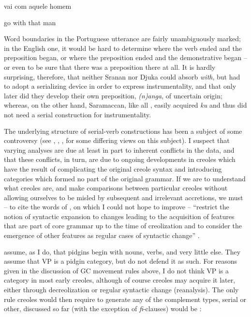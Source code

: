 \ea\label{ex:2:234}
vai com aquele homem
\z

\ea\label{ex:2:235}
go with that man
\z

Word boundaries in the Portuguese utterance are fairly un\-ambiguously marked; in the English one, it would be hard to determine where the verb ended and the preposition began, or where the preposi\-tion ended and the demonstrative began -- or even to be sure that there was a preposition there at all. It is hardly surprising, therefore, that neither Sranan nor Djuka could absorb \textit{with}, but had to adopt a serializing device in order to express instrumentality, and that only later did they develop their own preposition, \textit{(n)anga}, of uncertain origin; whereas, on the other hand, Saramaccan, like all , easily acquired \textit{ku} and thus did not need a serial construction for instrumentality.

The underlying structure of serial-verb constructions has been a subject of some controversy (see \citet{Williams1971,Williams1975}, \citet{Roberts1975}, \citet{Voorhoeve1975}, \citet{JansenEtAl1978} for some differing views on this subject). I suspect that varying analyses are due at least in part to inherent conflicts in the data, and that these conflicts, in turn, are due to ongoing developments in creoles which have the result of complicating the original creole syntax and intro\-ducing categories which formed no part of the original grammar. If we are to understand what creoles are, and make comparisons between particular creoles without allowing ourselves to be misled by sub\-sequent and irrelevant accretions, we must -- to cite the words of \citeauthor{KoopmanEtAl1981}, on which I could not hope to improve -- ``restrict the notion of syntactic expansion to changes leading to the acquisition of features that are part of core grammar up to the time of creolization and to consider the emergence of other features as regular cases of syntactic change'' \citep[218]{KoopmanEtAl1981}.

\citeauthor{KoopmanEtAl1981} assume, as I do, that pidgins begin with
nouns, verbs, and very little else. They assume that VP is a pidgin category, but do not defend it as such. For reasons given in the discussion of GC movement rules above, I do not think VP is a category in most early creoles, although of course creoles may acquire it later, either through decreolization or regular syntactic change (reanalysis). The only rule creoles would then require to generate any of the comple\-ment types, serial or other, discussed so far (with the exception of \textit{fi}-clauses) would be :

